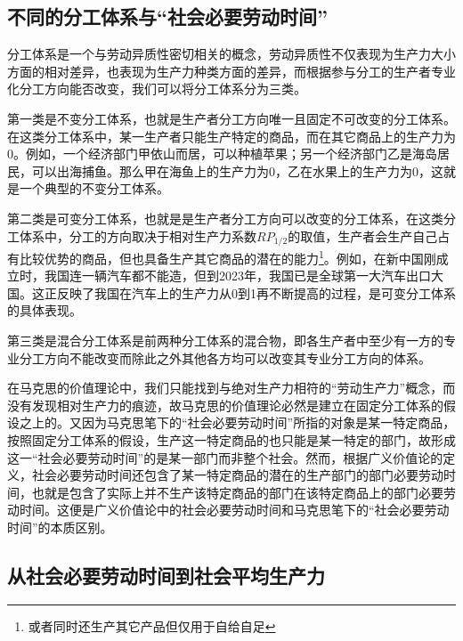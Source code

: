 \subsection{不同的分工体系与“社会必要劳动时间”}
分工体系是一个与劳动异质性密切相关的概念，劳动异质性不仅表现为生产力大小方面的相对差异，也表现为生产力种类方面的差异，而根据参与分工的生产者专业化分工方向能否改变，我们可以将分工体系分为三类\cite[111]{CaiJiMingCongXiaYiJieZhiLunDaoGuangYiJieZhiLunXiuDingBan2022}。

第一类是不变分工体系，也就是生产者分工方向唯一且固定不可改变的分工体系\cite[55-56]{CaiJiMingGuangYiJieZhiLun2001}。在这类分工体系中，某一生产者只能生产特定的商品，而在其它商品上的生产力为0。例如，一个经济部门甲依山而居，可以种植苹果；另一个经济部门乙是海岛居民，可以出海捕鱼。那么甲在海鱼上的生产力为0，乙在水果上的生产力为0，这就是一个典型的不变分工体系。

第二类是可变分工体系，也就是是生产者分工方向可以改变的分工体系\cite[55-56]{CaiJiMingGuangYiJieZhiLun2001}，在这类分工体系中，分工的方向取决于相对生产力系数$\mathit{RP}_{1/2}$的取值，生产者会生产自己占有比较优势的商品，但也具备生产其它商品的潜在的能力\footnote{或者同时还生产其它产品但仅用于自给自足}。例如，在新中国刚成立时，我国连一辆汽车都不能造，但到2023年，我国已是全球第一大汽车出口大国\cite{HuangXinZhongGuoZhiZaoQiangJinZhuangGuYouDaXiangQiang2024}。这正反映了我国在汽车上的生产力从0到1再不断提高的过程，是可变分工体系的具体表现。

第三类是混合分工体系是前两种分工体系的混合物，即各生产者中至少有一方的专业分工方向不能改变而除此之外其他各方均可以改变其专业分工方向的体系\cite[113]{CaiJiMingCongXiaYiJieZhiLunDaoGuangYiJieZhiLunXiuDingBan2022}。

在马克思的价值理论中，我们只能找到与绝对生产力相符的“劳动生产力”概念，而没有发现相对生产力的痕迹，故马克思的价值理论必然是建立在固定分工体系的假设之上的\cite[58]{LiRenJunJieZhiLiLun2004}。又因为马克思笔下的“社会必要劳动时间”所指的对象是某一特定商品，按照固定分工体系的假设，生产这一特定商品的也只能是某一特定的部门，故形成这一“社会必要劳动时间”的是某一部门而非整个社会。然而，根据广义价值论的定义，社会必要劳动时间还包含了某一特定商品的潜在的生产部门的部门必要劳动时间，也就是包含了实际上并不生产该特定商品的部门在该特定商品上的部门必要劳动时间。这便是广义价值论中的社会必要劳动时间和马克思笔下的“社会必要劳动时间”的本质区别。

\subsection{从社会必要劳动时间到社会平均生产力}

